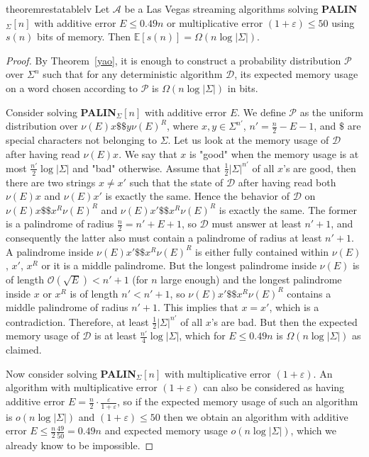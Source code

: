 \documentclass{article}[11pt,letter]
\newcommand{\bigo}{\mathcal{O}}
\newcommand{\alg}{\mathcal{A}}
\newcommand{\dalg}{\mathcal{D}}
\newcommand{\palin}[1][n]{{\bf PALIN}$_{\Sigma}[#1]$\xspace}
\newcommand{\aerr}{\ensuremath{E}}
\begin{document}
\begin{restatable}{theorem}{restatablelv}
\label{th:lv}
Let $\alg$ be a Las Vegas streaming algorithms solving \palin
with additive error $\aerr \le 0.49 n$ or multiplicative error $(1+\varepsilon) \le 50$
using $s(n)$ bits of memory.
Then $\mathbb{E}[s(n)]=\Omega(n \log |\Sigma|)$.
\end{restatable}



\begin{proof}
By Theorem~\ref{yao}, it is enough to construct a probability distribution $\mathcal{P}$ over $\Sigma^n$ such that
for any deterministic algorithm $\dalg$, its expected memory usage on a word chosen according to $\mathcal{P}$ is
$\Omega(n \log |\Sigma|)$ in bits.

Consider solving \palin with additive error $\aerr$.
We define $\mathcal{P}$ as the uniform distribution over $\nu(\aerr) x \$\$ y \nu(\aerr)^R$, where $x,y \in \Sigma^{n'}$, $n' = \frac{n}{2}-\aerr-1$, and $\$$ are special characters not belonging to $\Sigma$.
Let us look at the memory usage of $\dalg$ after having read $\nu(\aerr) x$. We say that $x$ is "good" when the memory usage 
is at most $\frac{n'}{2}\log |\Sigma|$ and "bad" otherwise.
Assume that $\frac{1}{2}|\Sigma|^{n'}$ of all $x$'s are good, then there are two strings
$x \not= x'$ such that the state of $\dalg$ after having read both $\nu(\aerr) x$ and $\nu(\aerr) x'$ is exactly the same. Hence the behavior of $\dalg$ on
$\nu(\aerr) x\$\$ x^R \nu(\aerr)^R$ and $\nu(\aerr) x'\$\$ x^R \nu(\aerr)^R$ is exactly the same. The former is a palindrome of radius $\frac{n}{2} = n'+\aerr+1$, so $\dalg$ 
must answer at least  $n'+1$, and consequently the latter also must contain a palindrome of radius at least $n'+1$.
A palindrome inside $\nu(\aerr) x'\$\$ x^R \nu(\aerr)^R$ is either fully contained within
$\nu(\aerr)$, $x'$, $x^R$ or it is a middle palindrome.
But the longest palindrome inside $\nu(\aerr)$ is of length $\bigo(\sqrt{\aerr})<n'+1$ (for $n$ large enough)
and the longest palindrome inside $x$ or $x^R$ is of length $n'<n'+1$, so
$\nu(\aerr) x'\$\$ x^R \nu(\aerr)^R$
contains a middle palindrome of radius $n'+1$. This implies that $x=x'$, which is a contradiction.
Therefore, at least $\frac{1}{2}|\Sigma|^{n'}$ of all $x$'s are bad. But then the expected memory usage of $\dalg$ is at least
$\frac{n'}{4}\log |\Sigma|$, which for $\aerr\le0.49 n$ is $\Omega(n \log |\Sigma|)$ as claimed.

Now consider solving \palin with multiplicative error $(1+\varepsilon)$. 
An algorithm with multiplicative error $(1+\varepsilon)$ can also be considered as having additive error $\aerr=\frac{n}{2} \cdot \frac{\varepsilon}{1+\varepsilon}$, so if the expected memory usage of
such an algorithm is $o(n\log |\Sigma|)$ and $(1+\varepsilon) \le 50$ then we obtain
an algorithm with additive error $\aerr \le \frac{n}{2}\frac{49}{50}=0.49n$ and expected memory usage $o(n\log |\Sigma|)$, which we already know to be impossible.
\end{proof}
\end{document}
